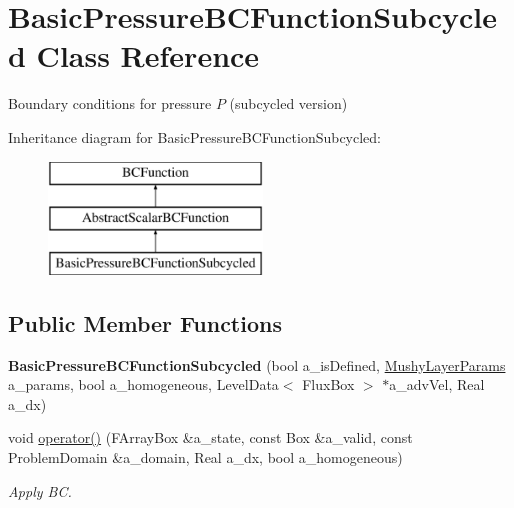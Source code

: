 \hypertarget{class_basic_pressure_b_c_function_subcycled}{\section{Basic\-Pressure\-B\-C\-Function\-Subcycled Class Reference}
\label{class_basic_pressure_b_c_function_subcycled}
}


Boundary conditions for pressure $P$ (subcycled version)  


Inheritance diagram for Basic\-Pressure\-B\-C\-Function\-Subcycled\-:\begin{figure}[H]
\begin{center}
\leavevmode
\includegraphics[height=3.000000cm]{class_basic_pressure_b_c_function_subcycled}
\end{center}
\end{figure}
\subsection*{Public Member Functions}
\begin{DoxyCompactItemize}
\item 
\hypertarget{class_basic_pressure_b_c_function_subcycled_a6a5170b9ac2de09c1a41a48dd7bb53cd}{{\bfseries Basic\-Pressure\-B\-C\-Function\-Subcycled} (bool a\-\_\-is\-Defined, \hyperlink{class_mushy_layer_params}{Mushy\-Layer\-Params} a\-\_\-params, bool a\-\_\-homogeneous, Level\-Data$<$ Flux\-Box $>$ $\ast$a\-\_\-adv\-Vel, Real a\-\_\-dx)}\label{class_basic_pressure_b_c_function_subcycled_a6a5170b9ac2de09c1a41a48dd7bb53cd}

\item 
\hypertarget{class_basic_pressure_b_c_function_subcycled_a11485aa5383fdd9b183da7905d852276}{void \hyperlink{class_basic_pressure_b_c_function_subcycled_a11485aa5383fdd9b183da7905d852276}{operator()} (F\-Array\-Box \&a\-\_\-state, const Box \&a\-\_\-valid, const Problem\-Domain \&a\-\_\-domain, Real a\-\_\-dx, bool a\-\_\-homogeneous)}\label{class_basic_pressure_b_c_function_subcycled_a11485aa5383fdd9b183da7905d852276}

\begin{DoxyCompactList}\small\item\em Apply B\-C. \end{DoxyCompactList}\end{DoxyCompactItemize}
